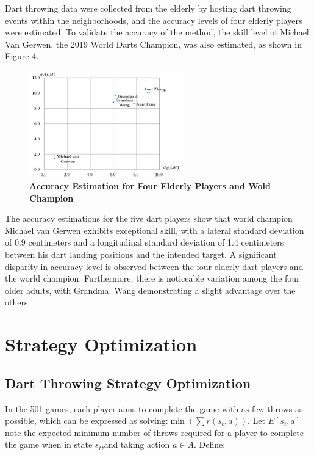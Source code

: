 \documentclass[cjjs]{ipart}
\theoremstyle{plain}
\begin{document}
Dart throwing data were collected from the elderly by hosting dart throwing events within the neighborhoods, and the accuracy levels of four elderly players were estimated. To validate the accuracy of the method, the skill level of Michael Van Gerwen, the 2019 World Darts Champion, was also estimated, as shown in Figure 4.

\begin{figure}[h]
    \centering
    \includegraphics[width=0.60\textwidth]{4.png} 
    \caption{\textbf{Accuracy Estimation for Four Elderly Players and Wold Champion}}
    \label{fig:dartboard}
\end{figure}

The accuracy estimations for the five dart players show that world champion Michael van Gerwen exhibits exceptional skill, with a lateral standard deviation of 0.9 centimeters and a longitudinal standard deviation of 1.4 centimeters between his dart landing positions and the intended target.  A significant disparity in accuracy level is observed between the four elderly dart players and the world champion.  Furthermore, there is noticeable variation among the four older adults, with Grandma. Wang demonstrating a slight advantage over the others.


\section{Strategy Optimization}
\subsection{Dart Throwing Strategy Optimization}
In the 501 games, each player aims to complete the game with as few throws as possible, which can be expressed as solving:$\min \left( \sum r(s_t, a) \right)$. Let $E[s_t, a]$ note the expected minimum number of throws required for a player to complete the game when in state $s_t$,and taking action $a \in A$. Define:
\end{document}
